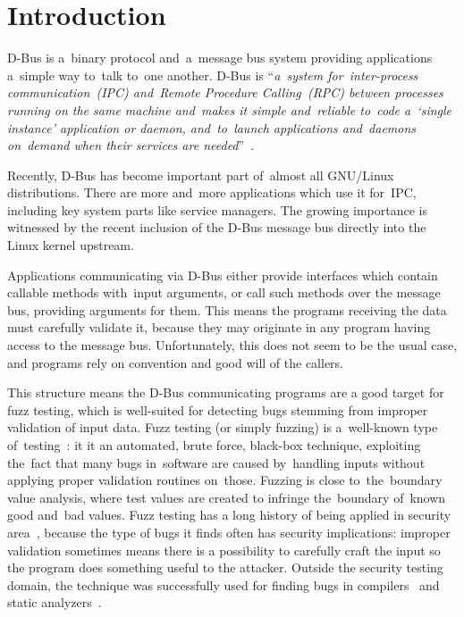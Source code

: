 \documentclass[conference]{IEEEtran}
\begin{document}
\section{Introduction}
D-Bus is a~binary protocol and~a~message bus system providing applications
a~simple way to~talk to~one another. D-Bus is ``\emph{a~system for~\mbox{inter-process}
communication~(IPC) and~Remote Procedure Calling~(RPC) between
processes running on the same machine and~makes it simple and~reliable to~code
a~`single instance' application or daemon, and~to~launch applications and~daemons
on~demand when their services are needed}''~\cite{dbus}.

Recently, D-Bus has become important part of~almost all GNU/Linux
distributions. There are more and~more applications which use it for~IPC,
including key system parts like service managers. The growing importance is witnessed
by the recent inclusion of the D-Bus message bus directly into the Linux kernel
upstream.

Applications communicating via D-Bus either provide interfaces which contain callable
methods with~input arguments, or call such methods over
the message bus, providing arguments for them. This means the programs
receiving the data must carefully validate it, because they may originate in
any program having access to the message bus. Unfortunately, this does not seem
to be the usual case, and programs rely on convention and good will of the
callers.

This structure means the D-Bus communicating programs are a good target for
fuzz testing, which is well-suited for detecting bugs stemming from improper
validation of input data. Fuzz testing (or simply fuzzing) is a~well-known type
of~testing~\cite{miller90-fuzz}: it it an automated, brute force, black-box
technique, exploiting the~fact that many bugs in~software are caused
by~handling inputs without applying proper validation routines on~those.
Fuzzing is close to~the~boundary value analysis, where test values are created
to infringe the~boundary of~known good and~bad values.  Fuzz testing has a long
history of being applied in security area~\cite{takanen08-book,sutton07-book},
because the type of bugs it finds often has security implications: improper
validation sometimes means there is a possibility to carefully craft the input
so the program does something useful to the attacker. Outside the security
testing domain, the technique was successfully used for finding bugs in
compilers~\cite{regehr11-compfuzz} and static analyzers~\cite{regehr12-safuzz}.
\end{document}
